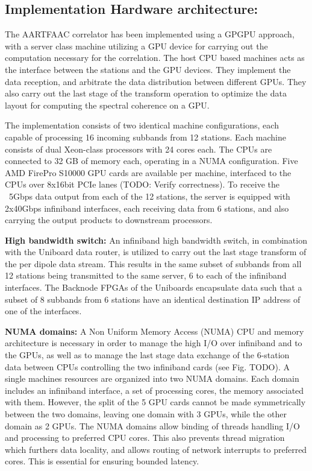 \documentclass{ws-jai}
\begin{document}
\subsection  {Implementation  Hardware  architecture:} 
The AARTFAAC  correlator has  been implemented  using a  GPGPU approach,  with a
server class  machine utilizing a  GPU device  for carrying out  the computation
necessary  for  the correlation.   The  host  CPU  based  machines acts  as  the
interface between  the stations and  the GPU  devices.  They implement  the data
reception, and arbitrate the data distribution between different GPUs. They also
carry out the last stage of the  transform operation to optimize the data layout
for computing the spectral coherence on a GPU.

The  implementation  consists  of  two identical  machine  configurations,  each
capable  of processing  16  incoming  subbands from  12  stations. Each  machine
consists  of  dual Xeon-class  processors  with  24  cores  each. The  CPUs  are
connected to 32 GB  of memory each, operating in a  NUMA configuration. Five AMD
FirePro S10000 GPU cards are available  per machine, interfaced to the CPUs over
8x16bit PCIe lanes (TODO: Verify correctness). To receive the ~5Gbps data output
from each  of the 12 stations,  the server is equipped  with 2x40Gbps infiniband
interfaces, each  receiving data from 6  stations, and also carrying  the output
products to downstream processors.

\noindent \textbf {High bandwidth switch:}  An infiniband high bandwidth switch,
in combination with the Uniboard data router,  is utilized to carry out the last
stage transform of the  per dipole data stream. This results  in the same subset
of subbands from all 12 stations being transmitted to the same server, 6 to each
of the infiniband  interfaces.  The Backnode FPGAs of  the Uniboards encapsulate
data  such that  a  subset of  8  subbands  from 6  stations  have an  identical
destination IP address of one of the interfaces.

\noindent \textbf  {NUMA domains:}  A  Non Uniform  Memory Access  (NUMA)  CPU and  memory
architecture is necessary in order to manage the high I/O over infiniband and to
the GPUs,  as well as to  manage the last  stage data exchange of  the 6-station
data  between CPUs  controlling the  two infiniband  cards (see  Fig. TODO).   A
single  machines resources  are organized  into two  NUMA domains.   Each domain
includes  an  infiniband  interface,  a  set of  processing  cores,  the  memory
associated with  them. However,  the split  of the  5 GPU  cards cannot  be made
symmetrically between the two domains, leaving one domain with 3 GPUs, while the
other domain as 2 GPUs.  The NUMA  domains allow binding of threads handling I/O
and  processing to  preferred CPU  cores.  This  also prevents  thread migration
which  furthers data  locality,  and  allows routing  of  network interrupts  to
preferred cores. This is essential for ensuring bounded latency.
\end{document}

